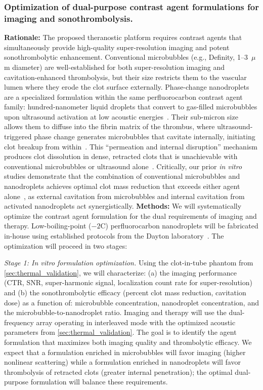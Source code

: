 \subsubsection{Optimization of dual-purpose contrast agent formulations for imaging and sonothrombolysis.\label{sec:agent_optimization}}
\textbf{Rationale:} The proposed theranostic platform requires contrast agents that simultaneously provide high-quality super-resolution imaging and potent sonothrombolytic enhancement. Conventional microbubbles (e.g., Definity, 1--3~$\mu$m diameter) are well-established for both super-resolution imaging and cavitation-enhanced thrombolysis, but their size restricts them to the vascular lumen where they erode the clot surface externally. Phase-change nanodroplets are a specialized formulation within the same perfluorocarbon contrast agent family: hundred-nanometer liquid droplets that convert to gas-filled microbubbles upon ultrasound activation at low acoustic energies~\cite{bautista2023current}. Their sub-micron size allows them to diffuse into the fibrin matrix of the thrombus, where ultrasound-triggered phase change generates microbubbles that cavitate internally, initiating clot breakup from within~\cite{kim2020comparison,goel2021nanodroplet}. This ``permeation and internal disruption'' mechanism produces clot dissolution in dense, retracted clots that is unachievable with conventional microbubbles or ultrasound alone~\cite{kim2022analysis}. Critically, our prior \textit{in vitro} studies demonstrate that the combination of conventional microbubbles and nanodroplets achieves optimal clot mass reduction that exceeds either agent alone~\cite{kim2022analysis}, as external cavitation from microbubbles and internal cavitation from activated nanodroplets act synergistically. \textbf{Methods:} We will systematically optimize the contrast agent formulation for the dual requirements of imaging and therapy. Low-boiling-point ($-2$\degree C) perfluorocarbon nanodroplets will be fabricated in-house using established protocols from the Dayton laboratory~\cite{kim2020comparison,bautista2023current}. The optimization will proceed in two stages:

\textit{Stage 1: In vitro formulation optimization.} Using the clot-in-tube phantom from \ref{sec:thermal_validation}, we will characterize: (a) the imaging performance (CTR, SNR, super-harmonic signal, localization count rate for super-resolution) and (b) the sonothrombolytic efficacy (percent clot mass reduction, cavitation dose) as a function of: microbubble concentration, nanodroplet concentration, and the microbubble-to-nanodroplet ratio. Imaging and therapy will use the dual-frequency array operating in interleaved mode with the optimized acoustic parameters from \ref{sec:thermal_validation}. The goal is to identify the agent formulation that maximizes both imaging quality and thrombolytic efficacy. We expect that a formulation enriched in microbubbles will favor imaging (higher nonlinear scattering) while a formulation enriched in nanodroplets will favor thrombolysis of retracted clots (greater internal penetration); the optimal dual-purpose formulation will balance these requirements.

